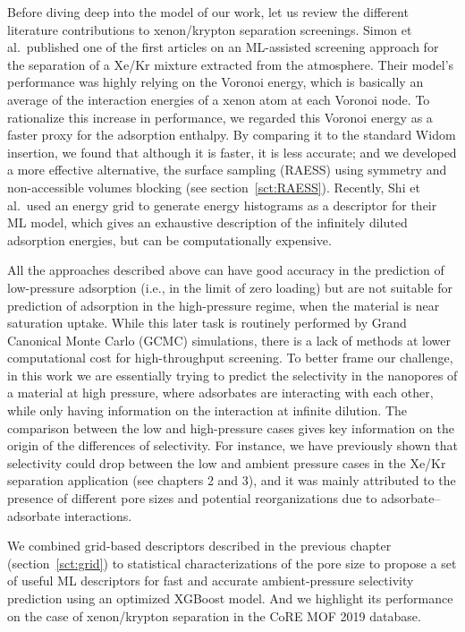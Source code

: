 \documentclass[main]{subfiles}
\begin{document}
Before diving deep into the model of our work, let us review the different literature contributions to xenon/krypton separation screenings. Simon et al.\ published one of the first articles on an ML-assisted screening approach for the separation of a Xe/Kr mixture extracted from the atmosphere.\autocite{Simon_2015} Their model's performance was highly relying on the Voronoi energy, which is basically an average of the interaction energies of a xenon atom at each Voronoi node.\autocite{Rycroft_2009} To rationalize this increase in performance, we regarded this Voronoi energy as a faster proxy for the adsorption enthalpy. By comparing it to the standard Widom insertion, we found that although it is faster, it is less accurate; and we developed a more effective alternative, the surface sampling (RAESS) using symmetry and non-accessible volumes blocking (see section~\ref{sct:RAESS}). Recently, Shi et al.\ used an energy grid to generate energy histograms as a descriptor for their ML model, which gives an exhaustive description of the infinitely diluted adsorption energies,\autocite{Shi_2023} but can be computationally expensive.

All the approaches described above can have good accuracy in the prediction of low-pressure adsorption (i.e., in the limit of zero loading) but are not suitable for prediction of adsorption in the high-pressure regime, when the material is near saturation uptake. While this later task is routinely performed by Grand Canonical Monte Carlo (GCMC) simulations, there is a lack of methods at lower computational cost for high-throughput screening. To better frame our challenge, in this work we are essentially trying to predict the selectivity in the nanopores of a material at high pressure, where adsorbates are interacting with each other, while only having information on the interaction at infinite dilution. The comparison between the low and high-pressure cases gives key information on the origin of the differences of selectivity. For instance, we have previously shown that selectivity could drop between the low and ambient pressure cases in the Xe/Kr separation application (see chapters 2 and 3), and it was mainly attributed to the presence of different pore sizes and potential reorganizations due to adsorbate--adsorbate interactions.

We combined grid-based descriptors described in the previous chapter (section~\ref{sct:grid}) to statistical characterizations of the pore size to propose a set of useful ML descriptors for fast and accurate ambient-pressure selectivity prediction using an optimized XGBoost model. And we highlight its performance on the case of xenon/krypton separation in the CoRE MOF 2019 database\autocite{Chung_2019}.
\end{document}
